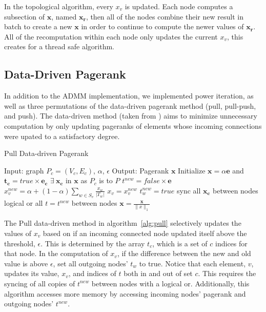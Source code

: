 \documentclass[letterpaper,12pt,onecolumn]{article}
\begin{document}
In the topological algorithm, every $x_v$ is updated. Each node computes a subsection of $\mathbf{x}$, named $\mathbf{x_r}$, then all of the nodes combine their new result in batch to create a new $\mathbf{x}$ in order to continue to compute the newer values of $\mathbf{x_r}$. All of the recomputation within each node only updates the current $x_v$, this creates for a thread safe algorithm.

\subsection{Data-Driven Pagerank}
In addition to the ADMM implementation, we implemented power iteration, as well as three permutations of the data-driven pagerank method (pull, pull-push, and push). The data-driven method (taken from \cite{Joyce}) aims to minimize unnecessary computation by only updating pageranks of elements whose incoming connections were upated to a satisfactory degree. 

\begin{algorithm}
\caption{Pull Data-driven Pagerank}
\label{alg:pull}
\begin{algorithmic}[1]
  \STATE Input: graph $P_{c} = (V_c, E_c)$, $\alpha$, $\epsilon$
  \STATE Output: Pagerank $\mathbf{x}$
  \STATE Initialize $\mathbf{x} = \alpha \mathbf{e}$ and $\mathbf{t_c} = true \times \mathbf{e_c}$
  \STATE $\exists  \medspace \mathbf{x_c}$ in $\mathbf{x}$ as $P_c$ is to $P$
	\STATE $t^{new} = false \times \mathbf{e}$
			\STATE $x_{v}^{new} = \alpha + (1 - \alpha) \sum_{w \in S_v} \frac{x_{w}}{|T_w|} $
				\STATE $x_v = x_v^{new}$
					\STATE $t_w^{new} = true$
				\ENDFOR
			\ENDIF
		\ENDIF
	\ENDFOR
	\STATE sync all $\mathbf{x_c}$ between nodes
	\STATE logical or all $t = t^{new}$ between nodes
  \ENDWHILE
  \STATE $\mathbf{x} = \frac{\mathbf{x} }{\|x\|_{1}}$
\end{algorithmic}
\end{algorithm}


The Pull data-driven method in algorithm~\ref{alg:pull} selectively updates the values of $x_v$ based on if an incoming connected node updated itself above the threshold, $\epsilon$. This is determined by the array $t_c$, which is a set of $c$ indices for that node. In the computation of $x_v$, if the difference between the new and old value is above $\epsilon$, set all outgoing nodes' $t_w$ to true. Notice that each element, $v$, updates its value, $x_v$, and indices of $t$ both in and out of set $c$. This requires the syncing of all copies of $t^{new}$ between nodes with a logical or. Additionally, this algorithm accesses more memory by accessing incoming nodes' pagerank and outgoing nodes' $t^{new}$.
\end{document}
